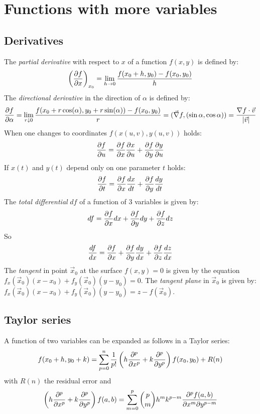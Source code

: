 \documentclass[twoside]{report}
\begin{document}
\section{Functions with more variables}
\subsection{Derivatives}
The {\it partial derivative} with respect to $x$ of a function $f(x,y)$ is defined by:
\[
\left(\frac{\partial f}{\partial x}\right)_{x_0}=\lim_{h\rightarrow0}\frac{f(x_0+h,y_0)-f(x_0,y_0)}{h}
\]
The {\it directional derivative} in the direction of $\alpha$ is defined by:
\[
\frac{\partial f}{\partial \alpha}=\lim_{r\downarrow0}\frac{f(x_0+r\cos(\alpha),y_0+r\sin(\alpha))-f(x_0,y_0)}{r}=
(\vec{\nabla}f,(\sin\alpha,\cos\alpha))=\frac{\nabla f\cdot\vec{v}}{|\vec{v}|}
\]
When one changes to coordinates $f(x(u,v),y(u,v))$ holds:
\[
\frac{\partial f}{\partial u}=\frac{\partial f}{\partial x}\frac{\partial x}{\partial u}+\frac{\partial f}{\partial y}\frac{\partial y}{\partial u}
\]
If $x(t)$ and $y(t)$ depend only on one parameter $t$ holds:
\[
\frac{\partial f}{\partial t}=\frac{\partial f}{\partial x}\frac{dx}{dt}+\frac{\partial f}{\partial y}\frac{dy}{dt}
\]
The {\it total differential} $df$ of a function of 3 variables is given by:
\[
df=\frac{\partial f}{\partial x}dx+\frac{\partial f}{\partial y}dy+\frac{\partial f}{\partial z}dz
\]
So
\[
\frac{df}{dx}=\frac{\partial f}{\partial x}+\frac{\partial f}{\partial y}\frac{dy}{dx}+\frac{\partial f}{\partial z}\frac{dz}{dx}
\]
The {\it tangent} in point $\vec{x}_0$ at the surface $f(x,y)=0$ is given by
the equation $f_x(\vec{x}_0)(x-x_0)+f_y(\vec{x}_0)(y-y_0)=0$.
\npar
The {\it tangent plane} in $\vec{x}_0$ is given by:
$f_x(\vec{x}_0)(x-x_0)+f_y(\vec{x}_0)(y-y_0)=z-f(\vec{x}_0)$.

\subsection{Taylor series}
A function of two variables can be expanded as follows in a Taylor series:
\[
f(x_0+h,y_0+k)=\sum\limits_{p=0}^n \frac{1}{p!}
\left(h\frac{\partial ^p}{\partial x^p}+k\frac{\partial ^p}{\partial y^p}\right)f(x_0,y_0)+R(n)
\]
with $R(n)$ the residual error and
\[
\left(h\frac{\partial ^p}{\partial x^p}+k\frac{\partial ^p}{\partial y^p}\right)f(a,b)=\sum\limits_{m=0}^p{p\choose m}
h^mk^{p-m}\frac{\partial^pf(a,b)}{\partial x^m\partial y^{p-m}}
\]
\end{document}
